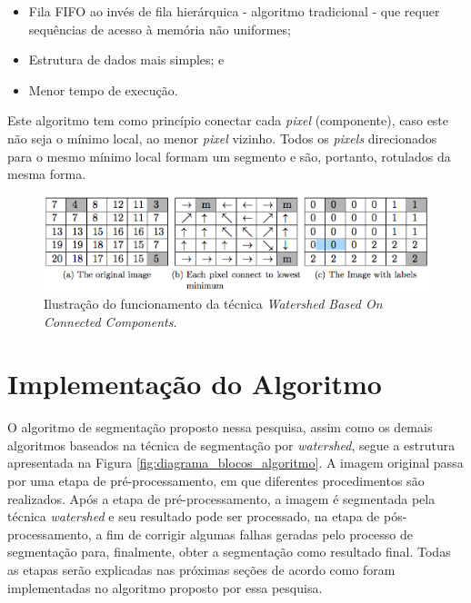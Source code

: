 \begin{itemize}
    \item Fila FIFO ao invés de fila hierárquica - algoritmo tradicional - que requer sequências de acesso à memória não uniformes;
    \item Estrutura de dados mais simples; e
    \item Menor tempo de execução.
\end{itemize}    

Este algoritmo tem como princípio conectar cada \textit{pixel} (componente), caso este não seja o mínimo local, ao menor \textit{pixel} vizinho. Todos os \textit{pixels} direcionados para o mesmo mínimo local formam um segmento e são, portanto, rotulados da mesma forma.

	\begin{figure}[!htb]
       \begin{center}  
          \includegraphics[width=0.8\columnwidth]{img/connected_components.jpg}
           \caption{\label{fig:connected_components}Ilustração do funcionamento da técnica \textit{Watershed Based On Connected Components}.}
       \end{center}
   \end{figure}

\section{Implementação do Algoritmo}\label{sec:alg}

O algoritmo de segmentação proposto nessa pesquisa, assim como os demais algoritmos baseados na técnica de segmentação por \textit{watershed}, segue a estrutura apresentada na Figura \ref{fig:diagrama_blocos_algoritmo}. A imagem original passa por uma etapa de pré-processamento, em que diferentes procedimentos são realizados. Após a etapa de pré-processamento, a imagem é segmentada pela técnica \textit{watershed} e seu resultado pode ser processado, na etapa de pós-processamento, a fim de corrigir algumas falhas geradas pelo processo de segmentação para, finalmente, obter a segmentação como resultado final.
Todas as etapas serão explicadas nas próximas seções de acordo como foram implementadas no algoritmo proposto por essa pesquisa.


